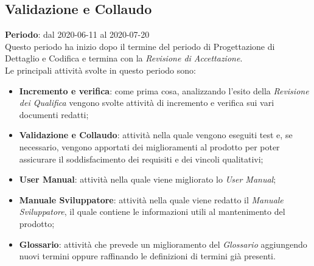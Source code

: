 \subsection{Validazione e Collaudo}
\textbf{Periodo}: dal 2020-06-11 al 2020-07-20 \\
Questo periodo ha inizio dopo il termine del periodo di Progettazione di Dettaglio e Codifica e termina con la \textit{Revisione di Accettazione}. \\
Le principali attività svolte in questo periodo sono:
\begin{itemize}
	\item \textbf{Incremento e verifica}: come prima cosa, analizzando l'esito della \textit{Revisione dei Qualifica} vengono svolte attività di incremento e verifica sui vari documenti redatti;
	\item \textbf{Validazione e Collaudo}: attività nella quale vengono eseguiti test e, se necessario, vengono apportati dei miglioramenti al prodotto per poter assicurare il soddisfacimento dei requisiti e dei vincoli qualitativi;
	\item \textbf{User Manual}: attività nella quale viene migliorato lo \textit{User Manual};
	\item \textbf{Manuale Sviluppatore}: attività nella quale viene redatto il \textit{Manuale Sviluppatore}, il quale contiene le informazioni utili al mantenimento del prodotto;
	\item \textbf{Glossario}: attività che prevede un miglioramento del \textit{Glossario} aggiungendo nuovi termini oppure raffinando le definizioni di termini già presenti.
\end{itemize}
